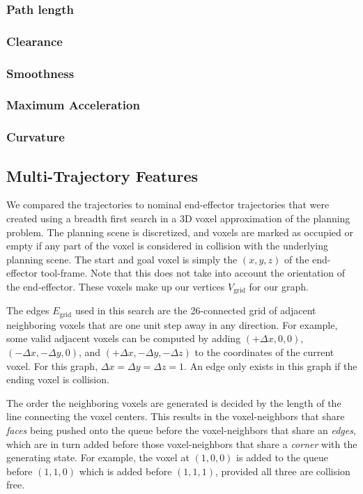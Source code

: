 \documentclass[letterpaper, 10 pt, conference]{ieeeconf}  %
\begin{document}
\subsubsection{Path length}

\subsubsection{Clearance}

\subsubsection{Smoothness}

\subsubsection{Maximum Acceleration}

\subsubsection{Curvature}

\subsection{Multi-Trajectory Features}
\label{subsec:multi_traj_feat}

We compared the trajectories to nominal end-effector trajectories that were created using a breadth first search in a 3D voxel approximation of the planning problem. The planning scene is discretized, and voxels are marked as occupied or empty if any part of the voxel is considered in collision with the underlying planning scene. The start and goal voxel is simply the $(x,y,z)$ of the end-effector tool-frame. Note that this does not take into account the orientation of the end-effector. These voxels make up our vertices $V_\text{grid}$ for our graph.

The edges $E_\text{grid}$ used in this search are the 26-connected grid of adjacent neighboring voxels that are one unit step away in any direction. For example, some valid adjacent voxels can be computed by adding $(+\Delta x,0,0)$, $(-\Delta x,-\Delta y,0)$, and $(+\Delta x, -\Delta y,-\Delta z)$ to the coordinates of the current voxel. For this graph, $\Delta x = \Delta y = \Delta z = 1$. An edge only exists in this graph if the ending voxel is collision.

The order the neighboring voxels are generated is decided by the length of the line connecting the voxel centers. This results in the voxel-neighbors that share \emph{faces} being pushed onto the queue before the voxel-neighbors that share an \emph{edges}, which are in turn added before those voxel-neighbors that share a \emph{corner} with the generating state. For example, the voxel at $(1,0,0)$ is added to the queue before $(1,1,0)$ which is added before $(1,1,1)$, provided all three are collision free. 
\end{document}
